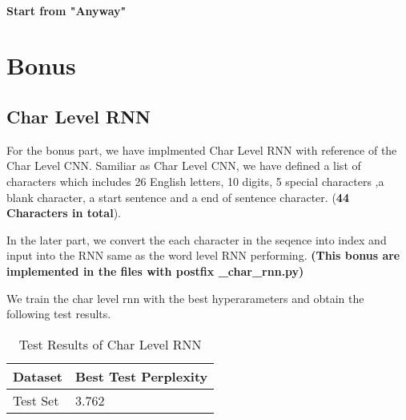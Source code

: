 \documentclass{article}
\begin{document}
\paragraph{Start from "Anyway"}

\pagebreak

\section{Bonus}

\subsection{Char Level RNN}
For the bonus part, we have implmented Char Level RNN with reference of the Char Level CNN. Samiliar as Char Level CNN, we have defined a list of characters which includes 26 English letters, 10 digits, 5 special characters ,a blank character, a start sentence and a end of sentence character. (\textbf{44 Characters in total}). 

In the later part, we convert the each character in the seqence into index and input into the RNN same as the word level RNN performing.  \textbf{(This bonus are implemented in the files with postfix \_char\_rnn.py)}

We train the char level rnn with the best hyperarameters and obtain the following test results.

\begin{table}[htb]
	\caption{Test Results of Char Level RNN}
	\label{sample-table}
	\centering
	\begin{tabular}{ll}
		\toprule
		\cmidrule{1-2}
		Dataset & Best Test Perplexity\\
		\midrule
		Test Set & 3.762   \\
		\bottomrule
	\end{tabular}
\end{table}
\end{document}
